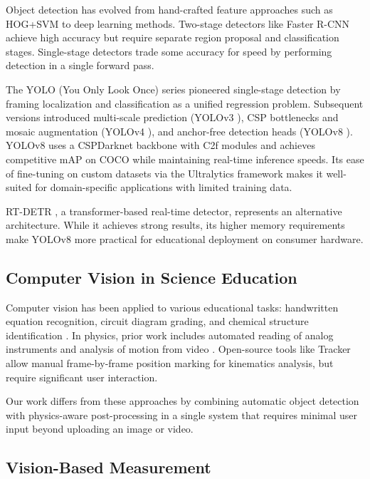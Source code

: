 \documentclass[12pt]{article}
\begin{document}
Object detection has evolved from hand-crafted feature approaches such as HOG+SVM \cite{dalal2005hog} to deep learning methods. Two-stage detectors like Faster R-CNN \cite{ren2015fasterrcnn} achieve high accuracy but require separate region proposal and classification stages. Single-stage detectors trade some accuracy for speed by performing detection in a single forward pass.

The YOLO (You Only Look Once) series \cite{redmon2016yolo} pioneered single-stage detection by framing localization and classification as a unified regression problem. Subsequent versions introduced multi-scale prediction (YOLOv3 \cite{redmon2018yolov3}), CSP bottlenecks and mosaic augmentation (YOLOv4 \cite{bochkovskiy2020yolov4}), and anchor-free detection heads (YOLOv8 \cite{ultralytics2023yolov8}). YOLOv8 uses a CSPDarknet backbone with C2f modules and achieves competitive mAP on COCO while maintaining real-time inference speeds. Its ease of fine-tuning on custom datasets via the Ultralytics framework makes it well-suited for domain-specific applications with limited training data.

RT-DETR \cite{lv2023rtdetr}, a transformer-based real-time detector, represents an alternative architecture. While it achieves strong results, its higher memory requirements make YOLOv8 more practical for educational deployment on consumer hardware.

\subsection{Computer Vision in Science Education}

Computer vision has been applied to various educational tasks: handwritten equation recognition, circuit diagram grading, and chemical structure identification \cite{rajan2020decimer}. In physics, prior work includes automated reading of analog instruments \cite{zhang2020meter} and analysis of motion from video \cite{tracker2024}. Open-source tools like Tracker allow manual frame-by-frame position marking for kinematics analysis, but require significant user interaction.

Our work differs from these approaches by combining automatic object detection with physics-aware post-processing in a single system that requires minimal user input beyond uploading an image or video.

\subsection{Vision-Based Measurement}
\end{document}
